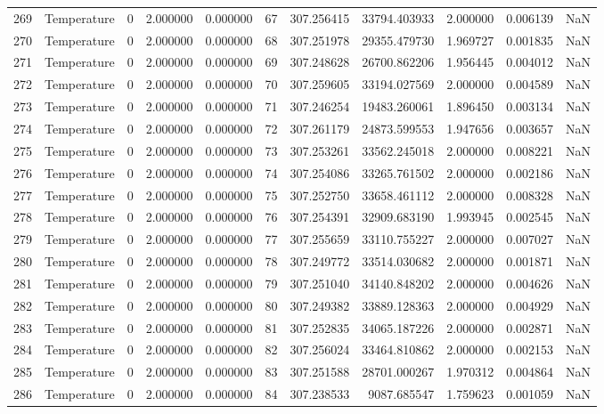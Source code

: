 \begin{tabular}{llrrrrrrrrr}
269 & Temperature & 0 & 2.000000 & 0.000000 & 67 & 307.256415 & 33794.403933 & 2.000000 & 0.006139 & NaN \\
270 & Temperature & 0 & 2.000000 & 0.000000 & 68 & 307.251978 & 29355.479730 & 1.969727 & 0.001835 & NaN \\
271 & Temperature & 0 & 2.000000 & 0.000000 & 69 & 307.248628 & 26700.862206 & 1.956445 & 0.004012 & NaN \\
272 & Temperature & 0 & 2.000000 & 0.000000 & 70 & 307.259605 & 33194.027569 & 2.000000 & 0.004589 & NaN \\
273 & Temperature & 0 & 2.000000 & 0.000000 & 71 & 307.246254 & 19483.260061 & 1.896450 & 0.003134 & NaN \\
274 & Temperature & 0 & 2.000000 & 0.000000 & 72 & 307.261179 & 24873.599553 & 1.947656 & 0.003657 & NaN \\
275 & Temperature & 0 & 2.000000 & 0.000000 & 73 & 307.253261 & 33562.245018 & 2.000000 & 0.008221 & NaN \\
276 & Temperature & 0 & 2.000000 & 0.000000 & 74 & 307.254086 & 33265.761502 & 2.000000 & 0.002186 & NaN \\
277 & Temperature & 0 & 2.000000 & 0.000000 & 75 & 307.252750 & 33658.461112 & 2.000000 & 0.008328 & NaN \\
278 & Temperature & 0 & 2.000000 & 0.000000 & 76 & 307.254391 & 32909.683190 & 1.993945 & 0.002545 & NaN \\
279 & Temperature & 0 & 2.000000 & 0.000000 & 77 & 307.255659 & 33110.755227 & 2.000000 & 0.007027 & NaN \\
280 & Temperature & 0 & 2.000000 & 0.000000 & 78 & 307.249772 & 33514.030682 & 2.000000 & 0.001871 & NaN \\
281 & Temperature & 0 & 2.000000 & 0.000000 & 79 & 307.251040 & 34140.848202 & 2.000000 & 0.004626 & NaN \\
282 & Temperature & 0 & 2.000000 & 0.000000 & 80 & 307.249382 & 33889.128363 & 2.000000 & 0.004929 & NaN \\
283 & Temperature & 0 & 2.000000 & 0.000000 & 81 & 307.252835 & 34065.187226 & 2.000000 & 0.002871 & NaN \\
284 & Temperature & 0 & 2.000000 & 0.000000 & 82 & 307.256024 & 33464.810862 & 2.000000 & 0.002153 & NaN \\
285 & Temperature & 0 & 2.000000 & 0.000000 & 83 & 307.251588 & 28701.000267 & 1.970312 & 0.004864 & NaN \\
286 & Temperature & 0 & 2.000000 & 0.000000 & 84 & 307.238533 & 9087.685547 & 1.759623 & 0.001059 & NaN \\

\end{tabular}
